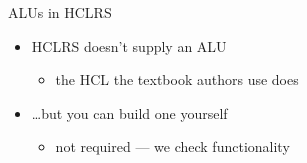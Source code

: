 \begin{frame}{ALUs in HCLRS}
    \begin{itemize}
    \item HCLRS doesn't supply an ALU
        \begin{itemize}
        \item the HCL the textbook authors use does
        \end{itemize}
    \item \ldots but you can build one yourself
        \begin{itemize}
        \item not required --- we check functionality
        \end{itemize}
    \end{itemize}
\end{frame}
